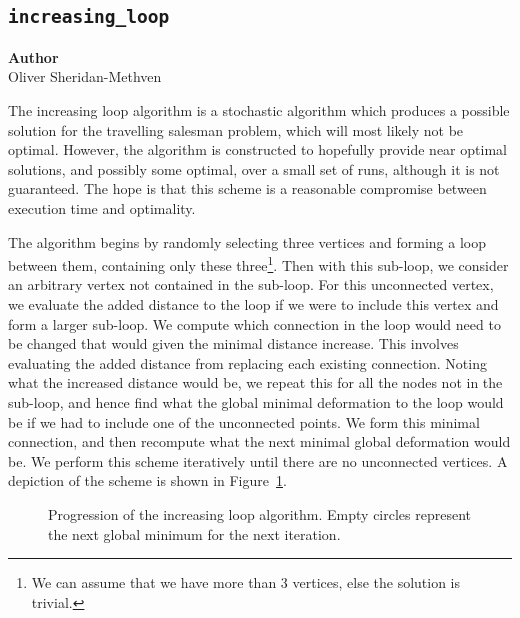 \subsection{\texttt{increasing\_loop}}
\label{subsec:increasing_loop}

\begin{flushright}
\textbf{Author} \\
Oliver Sheridan-Methven
\end{flushright}

The increasing loop algorithm is a stochastic algorithm which produces a possible solution for the travelling salesman problem, which will most likely not be optimal. However, the algorithm is constructed to hopefully provide near optimal solutions, and possibly some optimal, over a small set of runs, although it is not guaranteed. The hope is that this scheme is a reasonable compromise between execution time and optimality.

The algorithm begins by randomly selecting three vertices and forming a loop between them, containing only these three\footnote{We can assume that we have more than 3 vertices, else the solution is trivial.}. Then with this sub-loop, we consider an arbitrary vertex not contained in the sub-loop. For this unconnected vertex, we evaluate the added distance to the loop if we were to include this vertex and form a larger sub-loop. We compute which connection in the loop would need to be changed that would given the minimal distance increase. This involves evaluating the added distance from replacing each existing connection.
Noting what the increased distance would be, we repeat this for all the nodes not in the sub-loop, and hence find what the global minimal deformation to the loop would be if we had to include one of the unconnected points. We form this minimal connection, and then recompute what the next minimal global deformation would be. We perform this scheme iteratively until there are no unconnected vertices. A depiction of the scheme is shown in Figure~\ref{fig:increasing_loop}.


\begin{figure}[htb]
\centering

\caption{Progression of the increasing loop algorithm. Empty circles  represent the next global minimum for the next iteration.}
\label{fig:increasing_loop}
\end{figure}


